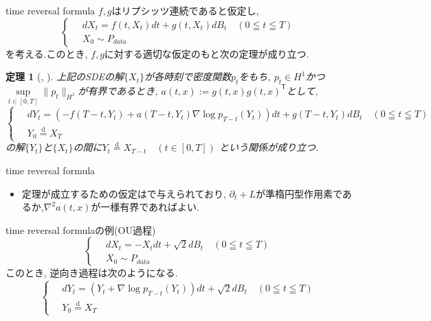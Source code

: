 \documentclass[dvipdfmx,11pt]{beamer}
\theoremstyle{plain}
\newtheorem{thm}{定理}
\theoremstyle{定義}
\begin{document}
  \begin{frame}{time reversal formula}
    $f,g$はリプシッツ連続であると仮定し, 
    \begin{equation}
        \left\{ \,
            \begin{aligned}
            & dX_t = f(t,X_t)dt+g(t,X_t)dB_t \quad (0\leqq t \leqq T) \\
            & X_0 \sim P_{data}
            \end{aligned}
        \right.
    \end{equation}
    を考える.このとき, $f, g$に対する適切な仮定のもと次の定理が成り立つ.
    \begin{thm}[\cite{anderson82}, \cite{haussmann_pardoux86}]
      上記のSDEの解$\{X_t\}$が各時刻で密度関数$p_t$をもち, $p_t\in H^{1}$かつ$\sup\limits_{t\in [0,T]}\|p_t\|_{H^{1}}$が有界であるとき, $a(t,x):=g(t,x)g(t,x)^\mathsf{T}$として, 
      \begin{equation}
        \left\{ \,
            \begin{aligned}
            & dY_t = (-f(T-t,Y_t)+a(T-t,Y_t)\nabla \log{p_{T-t}(Y_t)})dt+g(T-t,Y_t)dB_t \quad (0\leqq t \leqq T) \\
            & Y_0 \stackrel{\mathrm{d}}{=} X_T
            \end{aligned}
        \right.
      \end{equation}
      の解$\{Y_t\}$と$\{X_t\}$の間に$Y_t\stackrel{\mathrm{d}}{=}X_{T-t}\quad (t\in [0,T])$ という関係が成り立つ.
    \end{thm}
  \medskip
  \end{frame}
  \begin{frame}{time reversal formula}
    \begin{itemize}
        \item 定理が成立するための仮定は\cite{haussmann_pardoux86}で与えられており, $\partial_t+L$が準楕円型作用素であるか,$\nabla^2 a(t,x)$が一様有界であればよい.
    \end{itemize}
  \end{frame}

  \begin{frame}{time reversal formulaの例(OU過程)}
    \begin{equation}
        \left\{ \,
            \begin{aligned}
            & dX_t = -X_tdt+\sqrt{2}dB_t \quad (0\leqq t \leqq T) \\
            & X_0 \sim P_{data}
            \end{aligned}
        \right.
    \end{equation}
    このとき, 逆向き過程は次のようになる.
    \begin{equation}
        \left\{ \,
            \begin{aligned}
            & dY_t = (Y_t+\nabla \log{p_{T-t}(Y_t)})dt+\sqrt{2}dB_t \quad (0\leqq t \leqq T) \\
            & Y_0 \stackrel{\mathrm{d}}{=} X_T
            \end{aligned}
        \right.
    \end{equation}
  \end{frame}
\end{document}
